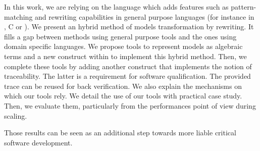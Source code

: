 \begin{ThesisAbstract}
\begin{EnglishAbstract}
\begin{spacing}{0.95}
In this work, we are relying on the {\tom} language which adds features such as
pattern-matching and rewriting capabilities in general purpose languages (for
instance in {\java}, C or {\ada}). We present an hybrid method of models
transformation by rewriting. It fills a gap between methods using general
purpose tools and the ones using domain specific languages. We propose tools to
represent models as algebraic terms and a new construct within {\tom} to
implement this hybrid method. Then, we complete these tools by adding another
construct that implements the notion of traceability. The latter is a
requirement for software qualification. The provided trace can be reused for
back verification. We also explain the mechanisms on which our tools rely. We
detail the use of our tools with practical case study. Then, we evaluate them,
particularly from the performances point of view during scaling. 

Those results can be seen as an additional step towards more liable critical
software development.


    \end{spacing}
  \end{EnglishAbstract}
\end{ThesisAbstract}

